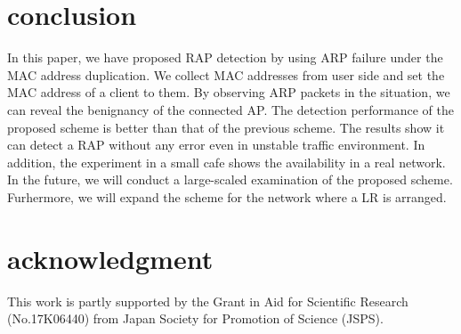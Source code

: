 \documentclass[conference]{IEEEtran}
\begin{document}
\section{conclusion}\label{sec:6}
In this paper, we have proposed RAP detection by using ARP failure under the MAC address duplication.
We collect MAC addresses from user side and set the MAC address of a client to them.
By observing ARP packets in the situation, we can reveal the benignancy of the connected AP.
The detection performance of the proposed scheme is better than that of the previous scheme.
The results show it can detect a RAP without any error even in unstable traffic environment.
In addition, the experiment in a small cafe shows the availability in a real network.
In the future, we will conduct a large-scaled examination of the proposed scheme.
Furhermore, we will expand the scheme for the network where a LR is arranged.

\section{acknowledgment}
This work is partly supported by the Grant in Aid for Scientific Research (No.17K06440) from Japan Society for Promotion of Science (JSPS).




\vspace{12pt}
\end{document}
